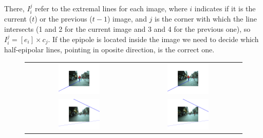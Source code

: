 There, $I_i^j$ refer to the extremal lines for each image, where $i$ indicates if it is the current ($t$) or the previous ($t - 1$) image, and $j$ is the corner with which the line intersects (1 and 2 for the current image and 3 and 4 for the previous one), so $I_i^j = [e_i] \times c_j$. If the epipole is located inside the image we need to decide which half-epipolar lines, pointing in oposite direction, is the correct one.


\begin{figure}[h!]
\centering
\begin{tabular}{cc}
\includegraphics[width=0.40\textwidth]{epipolarExtremeLeft1}\label{fig:cp04_epipolarExtremeLeft1} &
\includegraphics[width=0.40\textwidth]{epipolarExtremeRight1}\label{fig:cp04_epipolarExtremeRight1} \\
\includegraphics[width=0.40\textwidth]{epipolarExtremeLeft2}\label{fig:cp04_epipolarExtremeLeft2} &
\includegraphics[width=0.40\textwidth]{epipolarExtremeRight2}\label{fig:cp04_epipolarExtremeRight2} \\
\end{tabular}
\label{fig:cp04_epipolarExtreme}
\end{figure}

